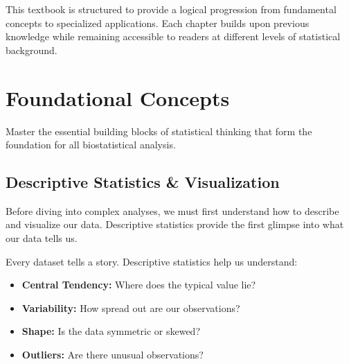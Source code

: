 \documentclass[
  11pt,
  letterpaper,
  oneside]{book}
\providecommand{\tightlist}{%
  \setlength{\itemsep}{0pt}\setlength{\parskip}{0pt}}\usepackage{longtable,booktabs,array}
\begin{document}
This textbook is structured to provide a logical progression from
fundamental concepts to specialized applications. Each chapter builds
upon previous knowledge while remaining accessible to readers at
different levels of statistical background.


\chapter{Foundational Concepts}\label{foundational-concepts}

Master the essential building blocks of statistical thinking that form
the foundation for all biostatistical analysis.

\section{Descriptive Statistics \&
Visualization}\label{descriptive-statistics-visualization}

Before diving into complex analyses, we must first understand how to
describe and visualize our data. Descriptive statistics provide the
first glimpse into what our data tells us.

\begin{tcolorbox}[enhanced jigsaw, toprule=.15mm, left=2mm, opacitybacktitle=0.6, colframe=quarto-callout-note-color-frame, leftrule=.75mm, titlerule=0mm, coltitle=black, colbacktitle=quarto-callout-note-color!10!white, toptitle=1mm, title=\textcolor{quarto-callout-note-color}{\faInfo}\hspace{0.5em}{Understanding Your Data}, bottomtitle=1mm, arc=.35mm, rightrule=.15mm, bottomrule=.15mm, breakable, opacityback=0, colback=white]

Every dataset tells a story. Descriptive statistics help us understand:

\begin{itemize}
\tightlist
\item
  \textbf{Central Tendency:} Where does the typical value lie?
\item
  \textbf{Variability:} How spread out are our observations?
\item
  \textbf{Shape:} Is the data symmetric or skewed?
\item
  \textbf{Outliers:} Are there unusual observations?
\end{itemize}

\end{tcolorbox}
\end{document}
